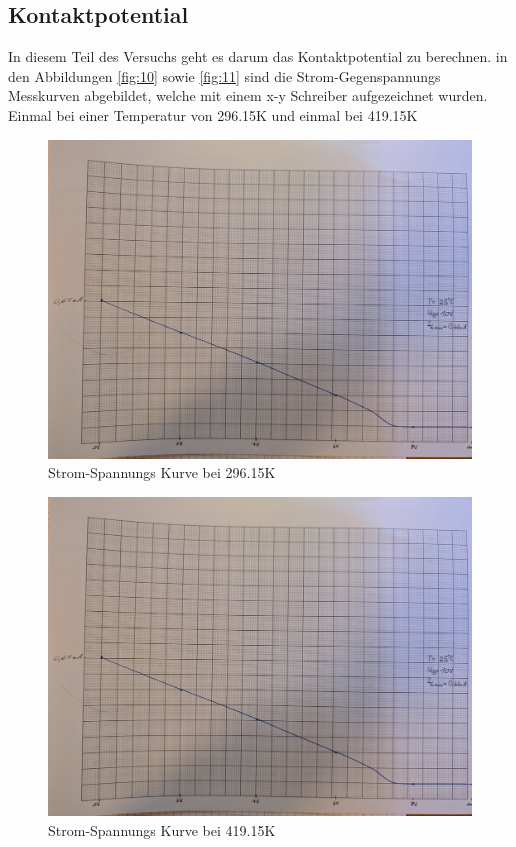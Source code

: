 \subsection{Kontaktpotential}
In diesem Teil des Versuchs geht es darum das Kontaktpotential zu berechnen. 
in den Abbildungen \autoref{fig:10} sowie \autoref{fig:11} sind die Strom-Gegenspannungs Messkurven
abgebildet, welche mit einem x-y Schreiber aufgezeichnet wurden. Einmal bei einer Temperatur von 296.15\unit{\kelvin}
und einmal bei 419.15\unit{\kelvin}
\begin{figure}[H]
  \centering
  \includegraphics[width=\linewidth]{Bilder/1.jpg}
  \caption{Strom-Spannungs Kurve bei 296.15\unit{\kelvin}}
  \label{fig:10}
\end{figure}

\begin{figure}[H]
  \centering
  \includegraphics[width=\linewidth]{Bilder/1.jpg}
  \caption{Strom-Spannungs Kurve bei 419.15\unit{\kelvin}}
  \label{fig:11}
\end{figure}

